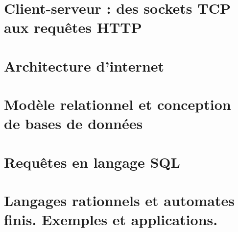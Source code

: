 \chapter{Client-serveur : des sockets TCP aux requêtes HTTP} \label{L25}


\chapter{Architecture d'internet} \label{L26}


\chapter{Modèle relationnel et conception de bases de données} \label{L27}


\chapter{Requêtes en langage SQL} \label{L28}


\chapter{Langages rationnels et automates finis. Exemples et applications.}\label{L29}


%
 


